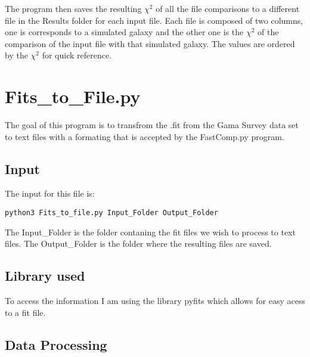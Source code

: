 \documentclass[11pt]{article}
\begin{document}
The program then saves the resulting $\chi^2$ of all the file comparisons to a different file in the Results folder for each input file. Each file is composed of two columns, one is corresponds to a simulated galaxy and the other one is the $\chi^2$ of the comparison of the input file with that simulated galaxy. The values are ordered by the $\chi^2$ for quick reference.

\newpage



\section{Fits\_to\_File.py}

The goal of this program is to transfrom the .fit from the Gama Survey data set to text files with a formating that is accepted by the FastComp.py program.

\subsection{Input}

The input for this file is:
\begin{verbatim}
python3 Fits_to_file.py Input_Folder Output_Folder
\end{verbatim}

The Input\_Folder is the folder contaning the fit files we wish to process to text files. The Output\_Folder is the folder where the resulting files are saved.

\subsection{Library used}

To access the information I am using the library pyfits which allows for easy acess to a fit file.

\subsection{Data Processing}
\end{document}
